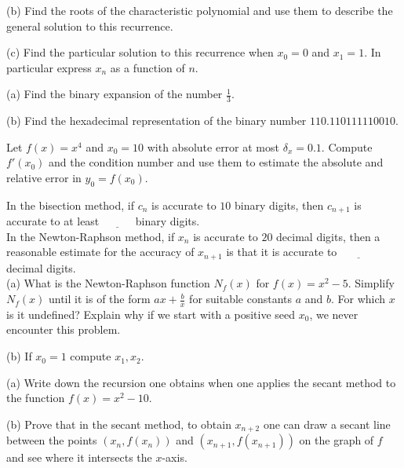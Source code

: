 \documentclass[12pt]{article}
\begin{document}
\noindent
(b) Find the roots of the characteristic polynomial and use them to describe the general solution to this recurrence. 

\vspace{1.5in}

\noindent
(c) Find the particular solution to this recurrence when $x_0=0$ and $x_1=1$. In particular express $x_n$ as a function of $n$.

\newpage

\noindent
(a) Find the binary expansion of the number $\frac{1}{3}$. \\

\vspace{3 in}

\noindent
(b) Find the hexadecimal representation of the binary number $110.110111110010$.

\newpage

\noindent
Let $f(x)=x^4$ and $x_0=10$ with absolute error at most $\delta_x=0.1$. Compute $f'(x_0)$ and the condition number and use them to estimate 
the absolute and relative error in $y_0=f(x_0)$. 

\newpage
{}
In the bisection method, if $c_n$ is accurate to $10$ binary digits, then $c_{n+1}$ is accurate to at least $\underline{~~~~~~~~~~~~}$ binary digits. \\
In the Newton-Raphson method, if $x_n$ is accurate to $20$ decimal digits, then a reasonable estimate for the accuracy of $x_{n+1}$ is that it is 
accurate to $\underline{~~~~~~~~~~~~~~~}$ decimal digits. \\ 

(a) What is the Newton-Raphson function $N_f(x)$ for $f(x)=x^2-5$. Simplify $N_f(x)$ until it is of the form 
$ax+\frac{b}{x}$ for suitable constants $a$ and $b$. For which $x$ is it undefined? Explain why if we start with a positive seed $x_0$, we never 
encounter this problem.

\vspace{2 in}

\noindent
(b) If $x_0=1$ compute $x_1, x_2$.

\newpage
{}
(a) Write down the recursion one obtains when one applies the secant method to the function $f(x)=x^2-10$. 

\vspace{2 in}

\noindent
(b) Prove that in the secant method, to obtain $x_{n+2}$ one can draw a secant line between the points $(x_n,f(x_n))$ and $(x_{n+1},f(x_{n+1}))$ on the 
graph of $f$ and see where it intersects the $x$-axis.
\end{document}
